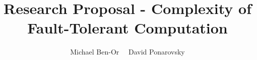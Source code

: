 \documentclass[manuscript,screen,review]{acmart}
\begin{document}

\title{ Research Proposal - Complexity of Fault-Tolerant Computation }
\author{Michael Ben-Or \ \ David Ponarovsky}
\maketitle

\newcommand*{\Mbas}{\mathcal{X}^\prime}
\newcommand*{\bas}{\mathcal{X}}
\newcommand*{\sMbas}{\Mbas}
\newcommand*{\QQ}{C_{X}/C_{Z}^\perp }
\newcommand*{\trig}{ Triorthogonal }
\newcommand*{\Hyp}{ Hyperproduct }
\newcommand*{\Cin}{ C_{\text{initial}} }
\newcommand*{\Ctan}{ C_{\text{Tan}} }



\newcommand*{\QACze}{\mathbf{QAC}_{0}}
\newcommand*{\QNCzef}{\mathbf{QNC}_{0,f}}
\newcommand*{\QNCze}{\mathbf{QNC}_{0}}
\newcommand*{\QNCon}{\mathbf{QNC}_{1}}
\newcommand*{\NCon}{\mathbf{NC}_{1}}
\newcommand*{\noiseQNCon}{noisy-$\QNCon$}
\newcommand*{\QNC}{\mathbf{QNC}}
\newcommand*{\QNCG}{\mathbf{QNC_G}}
\newcommand*{\NC}{\mathbf{NC}}
\newcommand*{\QNCiG}{\mathbf{QNC_{G,i}}}


\newcommand*{\CDO} {CDFT} 
\end{document}
